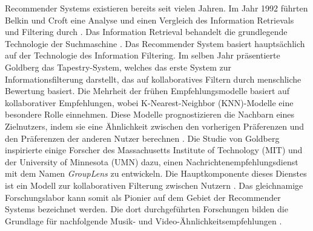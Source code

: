 Recommender Systems existieren bereits seit vielen Jahren. Im Jahr 1992 führten Belkin und Croft eine Analyse und einen Vergleich des Information Retrievals und Filtering durch \cite{dong2022brief}. Das Information Retrieval behandelt die grundlegende Technologie der Suchmaschine \cite{dong2022brief}. Das Recommender System basiert hauptsächlich auf der Technologie des Information Filtering. Im selben Jahr präsentierte Goldberg das Tapestry-System, welches das erste System zur Informationsfilterung darstellt, das auf kollaboratives Filtern durch menschliche Bewertung basiert. Die Mehrheit der frühen Empfehlungsmodelle basiert auf kollaborativer Empfehlungen, wobei K-Nearest-Neighbor (KNN)-Modelle eine besondere Rolle einnehmen. Diese Modelle prognostizieren die Nachbarn eines Zielnutzers, indem sie eine Ähnlichkeit zwischen den vorherigen Präferenzen und den Präferenzen der anderen Nutzer berechnen \cite{dong2022brief}. Die Studie von Goldberg inspirierte einige Forscher des Massachusetts Institute of Technology (MIT) und der University of Minnesota (UMN) dazu, einen Nachrichtenempfehlungsdienst mit dem Namen \emph{GroupLens} zu entwickeln. Die Hauptkomponente dieses Dienstes ist ein Modell zur kollaborativen Filterung zwischen Nutzern \cite{dong2022brief}. Das gleichnamige Forschungslabor kann somit als Pionier auf dem Gebiet der Recommender Systems bezeichnet werden. Die dort durchgeführten Forschungen bilden die Grundlage für nachfolgende Musik- und Video-Ähnlichkeitsempfehlungen \cite{dong2022brief}. \\

